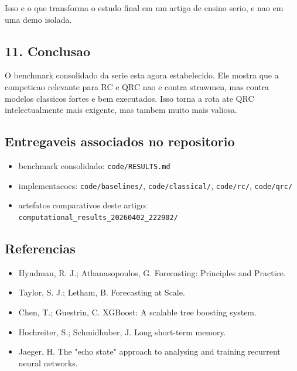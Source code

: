 \documentclass[12pt]{article}
\providecommand{\tightlist}{%
          \setlength{\itemsep}{0pt}\setlength{\parskip}{0pt}}
\begin{document}
Isso e o que transforma o estudo final em um artigo de ensino serio, e nao em uma demo isolada.

\subsection{11. Conclusao}\label{11-conclusao}

O benchmark consolidado da serie esta agora estabelecido. Ele mostra que a competicao relevante para RC e QRC nao e contra strawmen, mas contra modelos classicos fortes e bem executados. Isso torna a rota ate QRC intelectualmente mais exigente, mas tambem muito mais valiosa.

\subsection{Entregaveis associados no repositorio}\label{entregaveis-associados-no-repositorio}

\begin{itemize}
\tightlist
\item
  benchmark consolidado: \texttt{code/RESULTS.md}
\item
  implementacoes: \texttt{code/baselines/}, \texttt{code/classical/}, \texttt{code/rc/}, \texttt{code/qrc/}
\item
  artefatos comparativos deste artigo: \texttt{computational\_results\_20260402\_222902/}
\end{itemize}

\subsection{Referencias}\label{referencias}

\begin{itemize}
\tightlist
\item
  Hyndman, R. J.; Athanasopoulos, G. Forecasting: Principles and Practice.
\item
  Taylor, S. J.; Letham, B. Forecasting at Scale.
\item
  Chen, T.; Guestrin, C. XGBoost: A scalable tree boosting system.
\item
  Hochreiter, S.; Schmidhuber, J. Long short-term memory.
\item
  Jaeger, H. The "echo state" approach to analysing and training recurrent neural networks.
\end{itemize}

        
\end{document}
